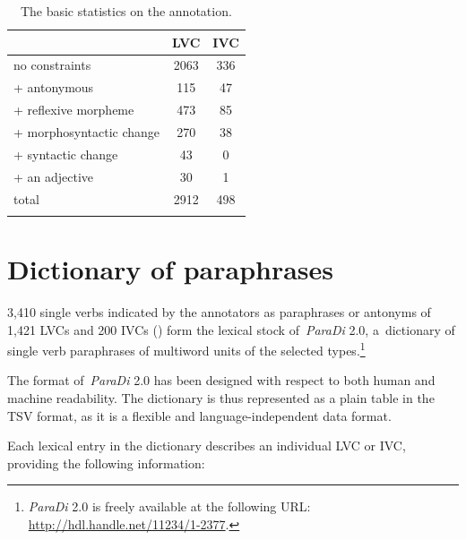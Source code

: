 \documentclass[output=paper
,modfonts
,nonflat]{langsci/langscibook}
\begin{document}
\begin{table}[tb]
	\centering
	\begin{tabular}{lcc}
		\lsptoprule
		                       & LVC   & IVC \\ \midrule
		no constraints         & 2063  &  336 \\ \midrule
		 + antonymous          &  115  &     47 \\
		 + reflexive morpheme  &  473  &     85 \\ 
		 + morphosyntactic change      &  270  &  38 \\ 
		 + syntactic change      &    43  &    0 \\  
		 + an adjective        &   30  &   1 \\ \midrule
		total\footnotemark     & 2912   & 498 \\ \lspbottomrule
	\end{tabular}
	\caption{The basic statistics on the annotation.}%
	\label{fig:annotation}
\end{table}


\section{Dictionary of paraphrases}
\label{results}

3,410 single verbs indicated by the annotators as paraphrases or antonyms of 
1,421 LVCs and 200 IVCs () form the lexical stock 
of~\emph{ParaDi} 2.0, a~dictionary of single verb paraphrases of  multiword 
units of the selected types.\footnote{\emph{ParaDi} 2.0 is freely available at 
the following URL: \url{http://hdl.handle.net/11234/1-2377}.} 

The format of~\emph{ParaDi} 2.0 has been designed with respect to both human 
and machine readability. The dictionary is thus represented as a plain table 
in the TSV format, as it is a flexible and language-independent data format.

Each lexical entry in the dictionary describes an individual LVC or IVC,
providing the following information:
\end{document}
